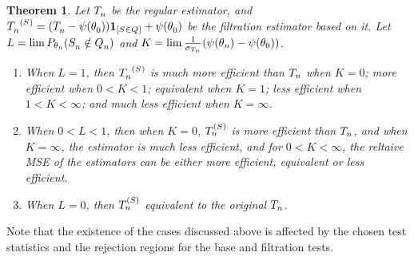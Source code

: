 \documentclass[ejs, twoside]{imsart}
\theoremstyle{plain}
\newtheorem{theorem}{Theorem}[section]
\theoremstyle{remark}
\newtheorem{example}[theorem]{Example}
\newtheorem{assumption}[theorem]{Assumption}
\newcommand{\andtext}{\ \mathrm{and}\ }
\newcommand{\filter}{*}
\numberwithin{equation}{section}
\numberwithin{table}{section}
\numberwithin{figure}{section}
\let\originalleft\left
\let\originalright\right
\renewcommand{\left}{\mathopen{}\mathclose\bgroup\originalleft}
\renewcommand{\right}{\aftergroup\egroup\originalright}
\begin{document}
	
	\begin{theorem} \label{thm:effclass}
		Let \(\basestat[][n]\) be the regular estimator, and \(\shrinkestim[][n] = \shrinkestimdef[][n] \) be the filtration estimator based on it.
		Let \(L = \lim P_{\theta_n} \left( \filevent[][n] \right) \) and \(K = \lim \frac{1}{\sigma_{T_n}} \left( \psi\left(\theta_n\right) - \psi\left(\theta_0\right) \right)\). %
		\begin{enumerate}[label = \roman*.]
			\item When \(L = 1\), then \(\shrinkestim[][n]\) is much more efficient than \(\estimreg\) when \(K = 0\); more efficient when \(0 < K < 1\); equivalent when \(K = 1\); less efficient when \(1<K<\infty\); and much less efficient when \(K = \infty\).
			\item When \(0 < L < 1\), then when \(K = 0\), \(\estimfil\) is more efficient than \(\estimreg\), and when \(K = \infty\), the estimator is much less efficient, and for \(0<K<\infty\), the reltaive MSE of the estimators can be either more efficient, equivalent or less efficient.
			\item When \(L = 0\), then \(\estimfil\) equivalent to the original \(\estimreg\).
			
		\end{enumerate}
	\end{theorem}
	







Note that the existence of the cases discussed above is affected by the chosen test statistics and the rejection regions for the base and filtration tests. %
\end{document}
